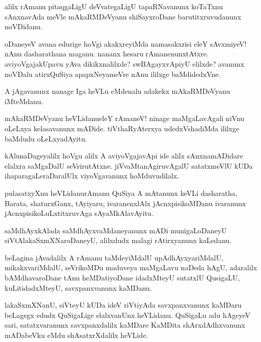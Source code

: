 \begin{mng}
alilx rAmanu pitaqgaLigU deVvategaLigU tapaRNavanunx koTaTxnu sAnxnavAda meVle mAkaRMDeVyanu shiSayxroDane barutitxruvudanunx noVDidanu.
\end{mng}

\begin{mng}
oDaneyeV avana edurige hoVgi akakxreyiMda namasakxrisi eleY sAvxmiyeV! nAnu dasharathana maganu. nananx hesaru rAmanenunxtAtxre. aviyoVgajakUpavu yAva dikikxnalilxde? swBAgayxvApiyU elilxde? avanunx noVDalu atirxQuSiya apapxNeyameVre nAnu ililxge baMdidedxVne.
\end{mng}

\begin{mng}
A jAgavanunx nanage Iga heVLu eMdenalu adakekx mAkaRMDeVyanu iMteMdanu.
\end{mng}

\begin{mng}
mAkaRMDeVyanu heVLidanu\mdash eleY rAmaneV! ninage maMgaLavAgali niVnu oLeLxya kelasavanunx mADide. tiVthaRyAterxya udedxVshadiMda ililxge baMdudu oLeLxyadAyitu.
\end{mng}

\begin{mng}
kAlunaDageyalilx hoVgu alilx A aviyoVgajavApi ide alilx sAnxnamADidare elalxra saMgaDalU seVrirutAtxne. jiVvaMtanAgiruvAgalU satatxmeVlU kUDa ihaparagaLeraDaralUlx viyoVgavanunx hoMduvudilalx.
\end{mng}

\begin{mng}
pulasatxyXnu heVLidanu\mdash rAmanu QuSiya A mAtanunx keVLi dasharatha, Barata, shaturxGanx, tAyiyaru, ivaranenxlAlx jAcnxpisikoMDanu ivaranunx jAcnxpisikoLuLxtitxruvAga sAyaMkAlavAyitu.
\end{mng}

\begin{mng}
saMdhAyxkAlada saMdhAyxvaMdaneyanunx mADi munigaLoDaneyU siVtAlakaSxmXNaroDaneyU, alilxdudx malagi rAtirxyanunx kaLedanu.
\end{mng}

\begin{mng}
beLagina jAvadalilx A rAmanu taMdeyiMdalU upAdhAyxyariMdalU, mikakxvariMdalU, seVrikoMDu maduveya maMgaLavu naDeda hAgU, adaralilx bAMdhavaroDane tAnu heMDatiyoDane idadxMteyU sutatxlU QusigaLU, kuLitidadxMteyU, savxpanxvanunx kaMDanu.
\end{mng}

\begin{mng}
lakaSxmXNanU, siVteyU kUDa ideV riVtiyAda savxpanxvanunx kaMDaru beLagegx edudx QuSigaLige elalxvanUnx heVLidanu. QuSigaLu adu hAgeyeV sari, satatxvaranunx savxpanxdalilx kaMDare KaMDita shArxdAdhxvanunx mADabeVku eMdu shAsatxrXdalilx heVLide.
\end{mng}

